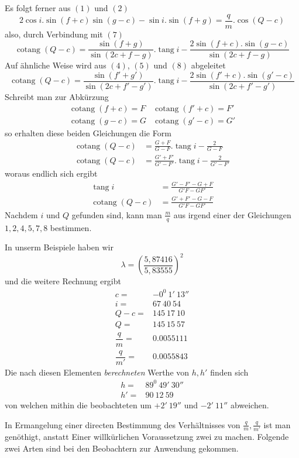 Es folgt ferner aus $(1)$ und $(2)$
\[
2\cos i.\sin(f+c)\sin(g-c)-\sin i.\sin(f+g)=\frac{q}{m}.\cos(Q-c)
\]
also, durch Verbindung mit $(7)$
\[
\operatorname{cotang}(Q-c)=\frac{\sin(f+g)}{\sin(2c+f-g)}.\operatorname{tang}i-\frac{2\sin(f+c).\sin(g-c)}{\sin(2c+f-g)}
\]
Auf ähnliche Weise wird aus $(4)$, $(5)$ und $(8)$ abgeleitet
\[
\operatorname{cotang}(Q-c)=\frac{\sin(f'+g')}{\sin(2c+f'-g')}.\operatorname{tang}i-\frac{2\sin(f'+c).\sin(g'-c)}{\sin(2c+f'-g')}
\]
Schreibt man zur Abkürzung
\[
\begin{array}{ll}
\operatorname{cotang}(f+c)=F&\operatorname{cotang}(f'+c)=F'\\
\operatorname{cotang}(g-c)=G&\operatorname{cotang}(g'-c)=G'
\end{array}
\]
so erhalten diese beiden Gleichungen die Form
\[
\begin{aligned}
\operatorname{cotang}(Q-c)&=\frac{G+F}{G-F}.\operatorname{tang}i-\frac{2}{G-F}\\
\operatorname{cotang}(Q-c)&=\frac{G'+F'}{G'-F'}.\operatorname{tang}i-\frac{2}{G'-F'}
\end{aligned}
\]
woraus endlich sich ergibt
\[
\begin{aligned}
\operatorname{tang}i&=\frac{G'-F'-G+F}{G'F-GF'}\\
\operatorname{cotang}(Q-c)&=\frac{G'+F'-G-F}{G'F-GF'}
\end{aligned}
\]
Nachdem $i$ und $Q$ gefunden sind, kann man $\frac{m}{q}$ aus irgend einer der Gleichungen $1,2,4,5,7,8$ bestimmen.

In unserm Beispiele haben wir
\[
\lambda=\left(\frac{5{,}87416}{5{,}83555}\right)^2
\]
und die weitere Rechnung ergibt
\[
\begin{array}{rl}
c=&-0^0\ 1'\ 13''\\
i=&67\ 40\ 54\\
Q-c=&145\ 17\ 10\\
Q=&145\ 15\ 57\\
\dfrac{q}{m}=&0.0055111\\[4pt]
\dfrac{q}{m'}=&0.0055843
\end{array}
\]
Die nach diesen Elementen \textit{berechneten} Werthe von $h,h'$ finden sich
\[
\begin{array}{rl}
h=&89^0\ 49'\ 30''\\
h'=&90\ 12\ 59
\end{array}
\]
von welchen mithin die beobachteten um $+2'\ 19''$ und $-2'\ 11''$ abweichen.

In Ermangelung einer directen Bestimmung des Verhältnisses von $\frac{q}{m},\frac{q}{m'}$ ist man genöthigt, anstatt Einer willkürlichen Voraussetzung zwei zu machen. Folgende zwei Arten sind bei den Beobachtern zur Anwendung gekommen.


